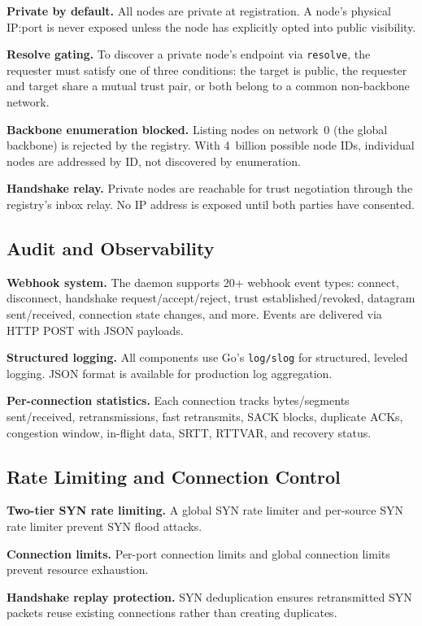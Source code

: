 \documentclass[11pt,a4paper]{article}
\begin{document}
\textbf{Private by default.} All nodes are private at registration. A node's physical IP:port is never exposed unless the node has explicitly opted into public visibility.

\textbf{Resolve gating.} To discover a private node's endpoint via \texttt{resolve}, the requester must satisfy one of three conditions: the target is public, the requester and target share a mutual trust pair, or both belong to a common non-backbone network.

\textbf{Backbone enumeration blocked.} Listing nodes on network~0 (the global backbone) is rejected by the registry. With 4~billion possible node IDs, individual nodes are addressed by ID, not discovered by enumeration.

\textbf{Handshake relay.} Private nodes are reachable for trust negotiation through the registry's inbox relay. No IP address is exposed until both parties have consented.

\subsection{Audit and Observability}

\textbf{Webhook system.} The daemon supports 20+ webhook event types: connect, disconnect, handshake request/accept/reject, trust established/revoked, datagram sent/received, connection state changes, and more. Events are delivered via HTTP POST with JSON payloads.

\textbf{Structured logging.} All components use Go's \texttt{log/slog} for structured, leveled logging. JSON format is available for production log aggregation.

\textbf{Per-connection statistics.} Each connection tracks bytes/segments sent/received, retransmissions, fast retransmits, SACK blocks, duplicate ACKs, congestion window, in-flight data, SRTT, RTTVAR, and recovery status.

\subsection{Rate Limiting and Connection Control}

\textbf{Two-tier SYN rate limiting.} A global SYN rate limiter and per-source SYN rate limiter prevent SYN flood attacks.

\textbf{Connection limits.} Per-port connection limits and global connection limits prevent resource exhaustion.

\textbf{Handshake replay protection.} SYN deduplication ensures retransmitted SYN packets reuse existing connections rather than creating duplicates.
\end{document}
